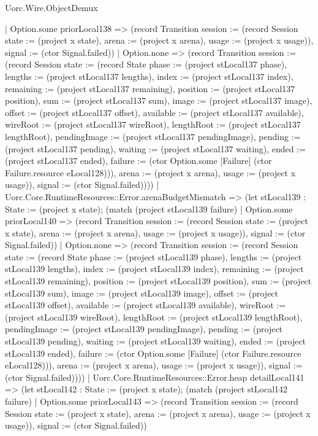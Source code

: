 \begin{lexlean}{Uorc.Wire.ObjectDemux}
\begin{semanticmodule}
{        | Option.some priorLocal138 => (record Transition {session := (record Session {state := (project x state), arena := (project x arena), usage := (project x usage)}), signal := (ctor Signal.failed)})
        | Option.none => (record Transition {session := (record Session {state := (record State {phase := (project stLocal137 phase), lengths := (project stLocal137 lengths), index := (project stLocal137 index), remaining := (project stLocal137 remaining), position := (project stLocal137 position), sum := (project stLocal137 sum), image := (project stLocal137 image), offset := (project stLocal137 offset), available := (project stLocal137 available), wireRoot := (project stLocal137 wireRoot), lengthRoot := (project stLocal137 lengthRoot), pendingImage := (project stLocal137 pendingImage), pending := (project stLocal137 pending), waiting := (project stLocal137 waiting), ended := (project stLocal137 ended), failure := (ctor Option.some [Failure] (ctor Failure.resource eLocal128))}), arena := (project x arena), usage := (project x usage)}), signal := (ctor Signal.failed)})))
      | Uorc.Core.RuntimeResources::Error.arenaBudgetMismatch => (let stLocal139 : State := (project x state); (match (project stLocal139 failure)
        | Option.some priorLocal140 => (record Transition {session := (record Session {state := (project x state), arena := (project x arena), usage := (project x usage)}), signal := (ctor Signal.failed)})
        | Option.none => (record Transition {session := (record Session {state := (record State {phase := (project stLocal139 phase), lengths := (project stLocal139 lengths), index := (project stLocal139 index), remaining := (project stLocal139 remaining), position := (project stLocal139 position), sum := (project stLocal139 sum), image := (project stLocal139 image), offset := (project stLocal139 offset), available := (project stLocal139 available), wireRoot := (project stLocal139 wireRoot), lengthRoot := (project stLocal139 lengthRoot), pendingImage := (project stLocal139 pendingImage), pending := (project stLocal139 pending), waiting := (project stLocal139 waiting), ended := (project stLocal139 ended), failure := (ctor Option.some [Failure] (ctor Failure.resource eLocal128))}), arena := (project x arena), usage := (project x usage)}), signal := (ctor Signal.failed)})))
      | Uorc.Core.RuntimeResources::Error.heap detailLocal141 => (let stLocal142 : State := (project x state); (match (project stLocal142 failure)
        | Option.some priorLocal143 => (record Transition {session := (record Session {state := (project x state), arena := (project x arena), usage := (project x usage)}), signal := (ctor Signal.failed)})
}
\end{semanticmodule}
\end{lexlean}
